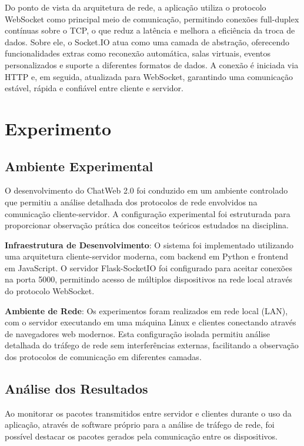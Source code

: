 \documentclass[conference,compsoc]{IEEEtran}
\begin{document}
\begin{otherlanguage}{brazil}
Do ponto de vista da arquitetura de rede, a aplicação utiliza o protocolo WebSocket como principal meio de comunicação, permitindo conexões full-duplex contínuas sobre o TCP, o que reduz a latência e melhora a eficiência da troca de dados. Sobre ele, o Socket.IO atua como uma camada de abstração, oferecendo funcionalidades extras como reconexão automática, salas virtuais, eventos personalizados e suporte a diferentes formatos de dados. A conexão é iniciada via HTTP e, em seguida, atualizada para WebSocket, garantindo uma comunicação estável, rápida e confiável entre cliente e servidor.

\section{Experimento}

\subsection{Ambiente Experimental}

O desenvolvimento do ChatWeb 2.0 foi conduzido em um ambiente controlado que permitiu a análise detalhada dos protocolos de rede envolvidos na comunicação cliente-servidor. A configuração experimental foi estruturada para proporcionar observação prática dos conceitos teóricos estudados na disciplina.

\textbf{Infraestrutura de Desenvolvimento}:
O sistema foi implementado utilizando uma arquitetura cliente-servidor moderna, com backend em Python e frontend em JavaScript. O servidor Flask-SocketIO foi configurado para aceitar conexões na porta 5000, permitindo acesso de múltiplos dispositivos na rede local através do protocolo WebSocket.

\textbf{Ambiente de Rede}:
Os experimentos foram realizados em rede local (LAN), com o servidor executando em uma máquina Linux e clientes conectando através de navegadores web modernos. Esta configuração isolada permitiu análise detalhada do tráfego de rede sem interferências externas, facilitando a observação dos protocolos de comunicação em diferentes camadas.

\subsection{Análise dos Resultados}

Ao monitorar os pacotes transmitidos entre servidor e clientes durante o uso da aplicação, através de software próprio para a análise de tráfego de rede, foi possível destacar os pacotes gerados pela comunicação entre os dispositivos.


\end{otherlanguage}
\end{document}
